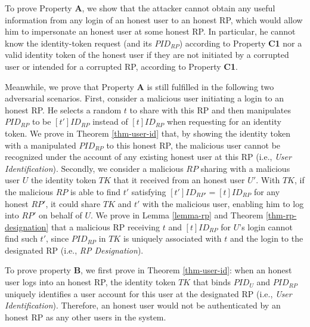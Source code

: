 To prove Property {\bf A}, we show that the attacker cannot obtain any useful information from any login of an honest user to an honest RP, which would allow him to impersonate an honest user at some honest RP. In particular, he cannot know the identity-token request (and its $PID_{RP}$) according to Property {\bf C1} nor a valid identity token of the honest user if they are not initiated by a corrupted user or intended for a corrupted RP, according to Property {\bf C1}.  

Meanwhile, we prove that Property {\bf A} is still fulfilled in the following two adversarial scenarios. First, consider a malicious user initiating a login to an honest RP. He selects a random $t$ to share with this RP and then manipulates $PID_{RP}$ to be $[t']ID_{RP}$ instead of $[t]ID_{RP}$ when requesting for an identity token. We prove in Theorem \ref{thm-user-id} that, by showing the identity token with a manipulated $PID_{RP}$ to this honest RP, the malicious user cannot be recognized under the account of any existing honest user at this RP (i.e., {\em User Identification}). Secondly, we consider a malicious $RP$ sharing with a malicious user $U$ the identity token $TK$ that it received from an honest user $U'$. With $TK$, if the malicious $RP$ is able to find $t'$ satisfying $[t']ID_{RP'}=[t]ID_{RP}$ for any honest $RP'$, it could share $TK$ and $t'$ with the malicious user, enabling him to log into $RP'$ on behalf of $U$. We prove in Lemma \ref{lemma-rp} and Theorem \ref{thm-rp-designation} that a malicious RP receiving $t$ and $[t]ID_{RP}$ for $U$'s login cannot find such $t'$, since $PID_{RP}$ in $TK$ is uniquely associated with $t$ and the login to the designated RP (i.e., {\em RP Designation}).


To prove property {\bf B}, we first prove in Theorem \ref{thm-user-id}: when an honest user logs into an honest RP, the identity token $TK$ that binds $PID_U$ and $PID_{RP}$ uniquely identifies a user account for this user at the designated RP (i.e., {\em User Identification}). Therefore, an honest user would not be authenticated by an honest RP as any other users in the system.

